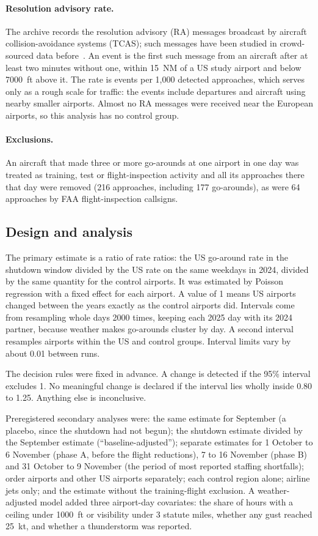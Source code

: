 \documentclass[11pt]{article}
\begin{document}
\paragraph{Resolution advisory rate.} The archive records the resolution advisory (RA) messages broadcast by aircraft collision-avoidance systems (TCAS); such messages have been studied in crowd-sourced data before~\cite{schafer2019}. An event is the first such message from an aircraft after at least two minutes without one, within 15~NM of a US study airport and below \num{7000}~ft above it. The rate is events per 1,000 detected approaches, which serves only as a rough scale for traffic: the events include departures and aircraft using nearby smaller airports. Almost no RA messages were received near the European airports, so this analysis has no control group.

\paragraph{Exclusions.} An aircraft that made three or more go-arounds at one airport in one day was treated as training, test or flight-inspection activity and all its approaches there that day were removed (216 approaches, including 177 go-arounds), as were 64 approaches by FAA flight-inspection callsigns.

\subsection{Design and analysis}

The primary estimate is a ratio of rate ratios: the US go-around rate in the shutdown window divided by the US rate on the same weekdays in 2024, divided by the same quantity for the control airports. It was estimated by Poisson regression with a fixed effect for each airport. A value of 1 means US airports changed between the years exactly as the control airports did. Intervals come from resampling whole days \num{2000} times, keeping each 2025 day with its 2024 partner, because weather makes go-arounds cluster by day. A second interval resamples airports within the US and control groups. Interval limits vary by about 0.01 between runs.

The decision rules were fixed in advance. A change is detected if the 95\% interval excludes 1. No meaningful change is declared if the interval lies wholly inside 0.80 to 1.25. Anything else is inconclusive.

Preregistered secondary analyses were: the same estimate for September (a placebo, since the shutdown had not begun); the shutdown estimate divided by the September estimate (``baseline-adjusted''); separate estimates for 1 October to 6 November (phase A, before the flight reductions), 7 to 16 November (phase B) and 31 October to 9 November (the period of most reported staffing shortfalls); order airports and other US airports separately; each control region alone; airline jets only; and the estimate without the training-flight exclusion. A weather-adjusted model added three airport-day covariates: the share of hours with a ceiling under \num{1000}~ft or visibility under 3 statute miles, whether any gust reached 25~kt, and whether a thunderstorm was reported.
\end{document}
